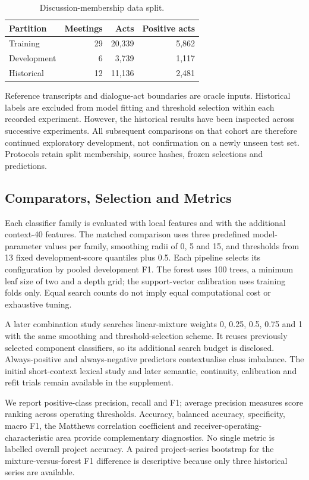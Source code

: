 \documentclass[conference,a4paper]{IEEEtran}
\begin{document}
\begin{table}[t]
\caption{Discussion-membership data split.}
\centering\footnotesize
\setlength{\tabcolsep}{2pt}
\begin{tabular}{p{}rrr}
\toprule
Partition & Meetings & Acts & Positive acts \\
\midrule
Training & 29 & 20,339 & 5,862 \\
Development & 6 & 3,739 & 1,117 \\
Historical & 12 & 11,136 & 2,481 \\
\bottomrule
\end{tabular}
\end{table}
Reference transcripts and dialogue-act boundaries are oracle inputs. Historical labels are excluded from model fitting and threshold selection within each recorded experiment. However, the historical results have been inspected across successive experiments. All subsequent comparisons on that cohort are therefore continued exploratory development, not confirmation on a newly unseen test set. Protocols retain split membership, source hashes, frozen selections and predictions.

\subsection{Comparators, Selection and Metrics}
Each classifier family is evaluated with local features and with the additional context-40 features. The matched comparison uses three predefined model-parameter values per family, smoothing radii of 0, 5 and 15, and thresholds from 13 fixed development-score quantiles plus 0.5. Each pipeline selects its configuration by pooled development F1. The forest uses 100 trees, a minimum leaf size of two and a depth grid; the support-vector calibration uses training folds only. Equal search counts do not imply equal computational cost or exhaustive tuning.

A later combination study searches linear-mixture weights 0, 0.25, 0.5, 0.75 and 1 with the same smoothing and threshold-selection scheme. It reuses previously selected component classifiers, so its additional search budget is disclosed. Always-positive and always-negative predictors contextualise class imbalance. The initial short-context lexical study and later semantic, continuity, calibration and refit trials remain available in the supplement.

We report positive-class precision, recall and F1; average precision measures score ranking across operating thresholds. Accuracy, balanced accuracy, specificity, macro F1, the Matthews correlation coefficient and receiver-operating-characteristic area provide complementary diagnostics. No single metric is labelled overall project accuracy. A paired project-series bootstrap for the mixture-versus-forest F1 difference is descriptive because only three historical series are available.
\end{document}
